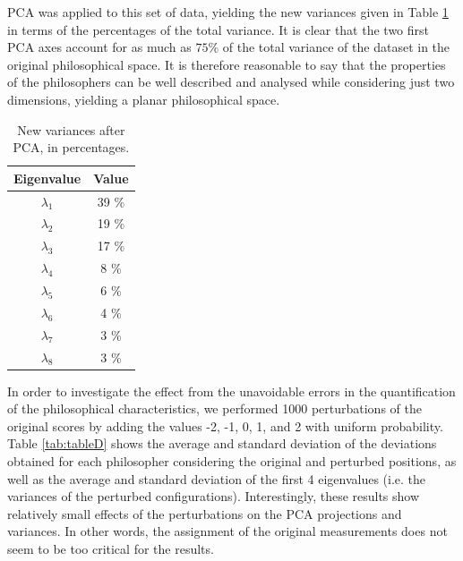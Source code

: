 \documentclass[%
 aip,
 jmp,%
 amsmath,amssymb,
 reprint,%
]{revtex4-1}
\begin{document}
PCA was applied to this set of data, yielding the new variances given
in Table \ref{tab:tableC} in terms of the percentages of the total
variance.  It is clear that the two first PCA axes account for as much
as $75\%$ of the total variance of the dataset in the original
philosophical space.  It is therefore reasonable to say that the
properties of the philosophers can be well described and analysed
while considering just two dimensions, yielding a planar philosophical
space.


\begin{table}%
\caption{\label{tab:tableC}New variances after PCA, in percentages.}

\begin{tabular}{|c||c|}
\hline
Eigenvalue & Value \\ \hline
$\lambda_1$ &  39 \% \\
$\lambda_2$ &  19 \% \\
$\lambda_3$ &  17 \% \\
$\lambda_4$ &   8 \% \\
$\lambda_5$ &   6 \% \\
$\lambda_6$ &   4 \% \\
$\lambda_7$ &   3 \%    \\
$\lambda_8$ &   3 \%    \\
\hline

\end{tabular}
\end{table}

In order to investigate the effect from the unavoidable errors in the
quantification of the philosophical characteristics, we performed 1000
perturbations of the original scores by adding the values -2, -1, 0,
1, and 2 with uniform probability.  Table \ref{tab:tableD} shows the
average and standard deviation of the deviations obtained for each
philosopher considering the original and perturbed positions, as well
as the average and standard deviation of the first 4 eigenvalues
(i.e. the variances of the perturbed configurations).  Interestingly,
these results show relatively small effects of the perturbations on
the PCA projections and variances.  In other words, the assignment of
the original measurements does not seem to be too critical for the
results.

\end{document}
